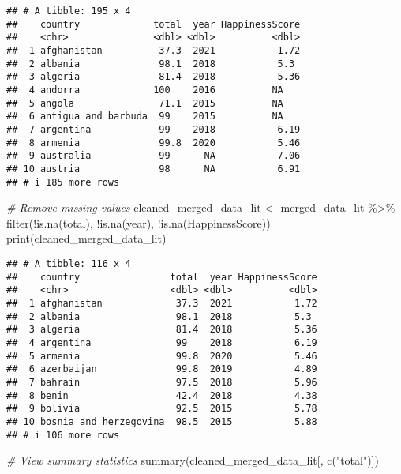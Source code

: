 \documentclass[
]{article}
\newenvironment{Shaded}{\begin{snugshade}}{\end{snugshade}}
\newcommand{\CommentTok}[1]{\textcolor[rgb]{0.56,0.35,0.01}{\textit{#1}}}
\newcommand{\FunctionTok}[1]{\textcolor[rgb]{0.00,0.00,0.00}{#1}}
\newcommand{\NormalTok}[1]{#1}
\newcommand{\OtherTok}[1]{\textcolor[rgb]{0.56,0.35,0.01}{#1}}
\newcommand{\SpecialCharTok}[1]{\textcolor[rgb]{0.00,0.00,0.00}{#1}}
\newcommand{\StringTok}[1]{\textcolor[rgb]{0.31,0.60,0.02}{#1}}
\begin{document}
\begin{verbatim}
## # A tibble: 195 x 4
##    country             total  year HappinessScore
##    <chr>               <dbl> <dbl>          <dbl>
##  1 afghanistan          37.3  2021           1.72
##  2 albania              98.1  2018           5.3 
##  3 algeria              81.4  2018           5.36
##  4 andorra             100    2016          NA   
##  5 angola               71.1  2015          NA   
##  6 antigua and barbuda  99    2015          NA   
##  7 argentina            99    2018           6.19
##  8 armenia              99.8  2020           5.46
##  9 australia            99      NA           7.06
## 10 austria              98      NA           6.91
## # i 185 more rows
\end{verbatim}

\begin{Shaded}
\begin{Highlighting}[]
\CommentTok{\# Remove missing values}
\NormalTok{cleaned\_merged\_data\_lit }\OtherTok{\textless{}{-}}\NormalTok{ merged\_data\_lit }\SpecialCharTok{\%\textgreater{}\%}
  \FunctionTok{filter}\NormalTok{(}\SpecialCharTok{!}\FunctionTok{is.na}\NormalTok{(total), }\SpecialCharTok{!}\FunctionTok{is.na}\NormalTok{(year), }\SpecialCharTok{!}\FunctionTok{is.na}\NormalTok{(HappinessScore))}
\FunctionTok{print}\NormalTok{(cleaned\_merged\_data\_lit)}
\end{Highlighting}
\end{Shaded}

\begin{verbatim}
## # A tibble: 116 x 4
##    country                total  year HappinessScore
##    <chr>                  <dbl> <dbl>          <dbl>
##  1 afghanistan             37.3  2021           1.72
##  2 albania                 98.1  2018           5.3 
##  3 algeria                 81.4  2018           5.36
##  4 argentina               99    2018           6.19
##  5 armenia                 99.8  2020           5.46
##  6 azerbaijan              99.8  2019           4.89
##  7 bahrain                 97.5  2018           5.96
##  8 benin                   42.4  2018           4.38
##  9 bolivia                 92.5  2015           5.78
## 10 bosnia and herzegovina  98.5  2015           5.88
## # i 106 more rows
\end{verbatim}

\begin{Shaded}
\begin{Highlighting}[]
\CommentTok{\# View summary statistics }
\FunctionTok{summary}\NormalTok{(cleaned\_merged\_data\_lit[, }\FunctionTok{c}\NormalTok{(}\StringTok{"total"}\NormalTok{)])}
\end{Highlighting}
\end{Shaded}
\end{document}
